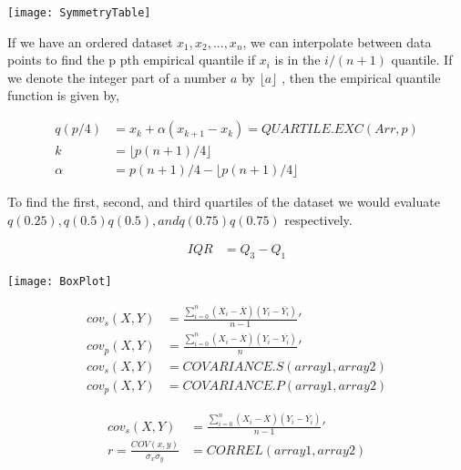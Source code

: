 {

    \vspace*{.1in}
    \texttt{[image: SymmetryTable]}
}


{

    If we have an ordered dataset $ x_{1},x_{2},...,x_{n}$, we can interpolate
    between data points to find the p pth empirical quantile if $x_{i}$ is in
    the ${\displaystyle i/(n+1)}$ quantile. If we denote the integer part of a
    number $a$ by $\lfloor a\rfloor$ , then the empirical quantile function is
    given by,

    \begin{align*}
        q(p/4) &= x_k + \alpha ( x_{k + 1} - x_k ) = QUARTILE.EXC(Arr, p) \\
        k &=\lfloor p(n+1)/4\rfloor \\
        \alpha &=p(n+1)/4-\lfloor p(n+1)/4\rfloor
    \end{align*}

    To find the first, second, and third quartiles of the dataset we would
    evaluate $q(0.25), q ( 0.5 ) q(0.5), and q ( 0.75 ) q(0.75)$ respectively. 

}

{
    \begin{align*}
        IQR &= Q_3-Q_1
    \end{align*}
}


{
    \vspace*{.1in}
    \texttt{[image: BoxPlot]}
}

{
    \begin{align*}
        cov_s(X,Y) &= \frac{\sum_{i=0}^{n} (X_i-\overline{X})(Y_i-\overline{Y_i})}{n-1}' \\
        cov_p(X,Y) &= \frac{\sum_{i=0}^{n} (X_i-\overline{X})(Y_i-\overline{Y_i})}{n}' \\
        cov_s(X,Y) &= COVARIANCE.S(array1, array2) \\
        cov_p(X,Y) &= COVARIANCE.P(array1, array2)
    \end{align*}
}

{
    \begin{align*}
        cov_s(X,Y) &= \frac{\sum_{i=0}^{n} (X_i-\overline{X})(Y_i-\overline{Y_i})}{n-1}' \\
        r = \displaystyle\frac{COV(x,y)}{\sigma_x \sigma_y} &= CORREL(array1, array2)
    \end{align*}
}
